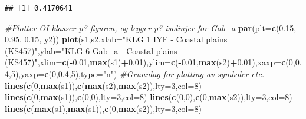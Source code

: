 \documentclass[]{article}
\newenvironment{Shaded}{\begin{snugshade}}{\end{snugshade}}
\newcommand{\CommentTok}[1]{\textcolor[rgb]{0.56,0.35,0.01}{\textit{#1}}}
\newcommand{\DataTypeTok}[1]{\textcolor[rgb]{0.13,0.29,0.53}{#1}}
\newcommand{\DecValTok}[1]{\textcolor[rgb]{0.00,0.00,0.81}{#1}}
\newcommand{\FloatTok}[1]{\textcolor[rgb]{0.00,0.00,0.81}{#1}}
\newcommand{\KeywordTok}[1]{\textcolor[rgb]{0.13,0.29,0.53}{\textbf{#1}}}
\newcommand{\NormalTok}[1]{#1}
\newcommand{\OperatorTok}[1]{\textcolor[rgb]{0.81,0.36,0.00}{\textbf{#1}}}
\newcommand{\StringTok}[1]{\textcolor[rgb]{0.31,0.60,0.02}{#1}}
\begin{document}
\begin{verbatim}
## [1] 0.4170641
\end{verbatim}

\begin{Shaded}
\begin{Highlighting}[]
\CommentTok{#Plotter OI-klasser p? figuren, og legger p? isolinjer for Gab_a}
\KeywordTok{par}\NormalTok{(}\DataTypeTok{plt=}\KeywordTok{c}\NormalTok{(}\FloatTok{0.15}\NormalTok{, }\FloatTok{0.95}\NormalTok{, }\FloatTok{0.15}\NormalTok{, y2))}
\KeywordTok{plot}\NormalTok{(s1,s2,}\DataTypeTok{xlab=}\StringTok{"KLG 1 IYF - Coastal plains (KS457)"}\NormalTok{,}\DataTypeTok{ylab=}\StringTok{"KLG 6 Gab_a - Coastal plains (KS457)"}\NormalTok{,}\DataTypeTok{xlim=}\KeywordTok{c}\NormalTok{(}\OperatorTok{-}\FloatTok{0.01}\NormalTok{,}\KeywordTok{max}\NormalTok{(s1)}\OperatorTok{+}\FloatTok{0.01}\NormalTok{),}\DataTypeTok{ylim=}\KeywordTok{c}\NormalTok{(}\OperatorTok{-}\FloatTok{0.01}\NormalTok{,}\KeywordTok{max}\NormalTok{(s2)}\OperatorTok{+}\FloatTok{0.01}\NormalTok{),}\DataTypeTok{xaxp=}\KeywordTok{c}\NormalTok{(}\DecValTok{0}\NormalTok{,}\FloatTok{0.4}\NormalTok{,}\DecValTok{5}\NormalTok{),}\DataTypeTok{yaxp=}\KeywordTok{c}\NormalTok{(}\DecValTok{0}\NormalTok{,}\FloatTok{0.4}\NormalTok{,}\DecValTok{5}\NormalTok{),}\DataTypeTok{type=}\StringTok{"n"}\NormalTok{) }\CommentTok{#Grunnlag for plotting av symboler etc.}
\KeywordTok{lines}\NormalTok{(}\KeywordTok{c}\NormalTok{(}\DecValTok{0}\NormalTok{,}\KeywordTok{max}\NormalTok{(s1)),}\KeywordTok{c}\NormalTok{(}\KeywordTok{max}\NormalTok{(s2),}\KeywordTok{max}\NormalTok{(s2)),}\DataTypeTok{lty=}\DecValTok{3}\NormalTok{,}\DataTypeTok{col=}\DecValTok{8}\NormalTok{)}
\KeywordTok{lines}\NormalTok{(}\KeywordTok{c}\NormalTok{(}\DecValTok{0}\NormalTok{,}\KeywordTok{max}\NormalTok{(s1)),}\KeywordTok{c}\NormalTok{(}\DecValTok{0}\NormalTok{,}\DecValTok{0}\NormalTok{),}\DataTypeTok{lty=}\DecValTok{3}\NormalTok{,}\DataTypeTok{col=}\DecValTok{8}\NormalTok{)}
\KeywordTok{lines}\NormalTok{(}\KeywordTok{c}\NormalTok{(}\DecValTok{0}\NormalTok{,}\DecValTok{0}\NormalTok{),}\KeywordTok{c}\NormalTok{(}\DecValTok{0}\NormalTok{,}\KeywordTok{max}\NormalTok{(s2)),}\DataTypeTok{lty=}\DecValTok{3}\NormalTok{,}\DataTypeTok{col=}\DecValTok{8}\NormalTok{)}
\KeywordTok{lines}\NormalTok{(}\KeywordTok{c}\NormalTok{(}\KeywordTok{max}\NormalTok{(s1),}\KeywordTok{max}\NormalTok{(s1)),}\KeywordTok{c}\NormalTok{(}\DecValTok{0}\NormalTok{,}\KeywordTok{max}\NormalTok{(s2)),}\DataTypeTok{lty=}\DecValTok{3}\NormalTok{,}\DataTypeTok{col=}\DecValTok{8}\NormalTok{)}


\end{Highlighting}
\end{Shaded}
\end{document}
